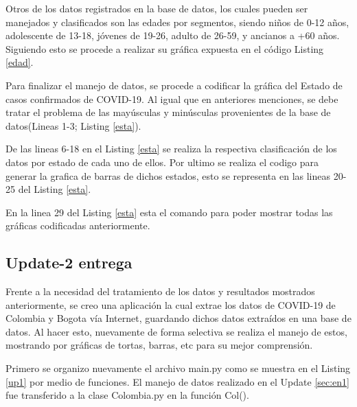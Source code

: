 \documentclass[conference,compsoc,onecolumn]{IEEEtran}
\begin{document}
Otros de los datos registrados en la base de datos, los cuales pueden ser manejados y clasificados son las edades por segmentos, siendo niños de 0-12 años, adolescente de 13-18, jóvenes de 19-26, adulto de 26-59, y ancianos a +60 años. Siguiendo esto se procede a realizar su gráfica expuesta en el código  Listing \ref{edad}.





Para finalizar el manejo de datos, se procede a codificar la gráfica del Estado de casos confirmados de COVID-19. Al igual que en anteriores menciones, se debe tratar el problema de las mayúsculas y minúsculas provenientes de la base de datos(Lineas 1-3; Listing  \ref{esta}). 




De las lineas 6-18 en el Listing \ref{esta} se realiza la respectiva clasificación de los datos por estado de cada uno de ellos. Por ultimo se realiza el codigo para generar la grafica de barras de dichos estados, esto se representa en las lineas 20-25 del Listing \ref{esta}.


En la linea 29 del Listing \ref{esta} esta el comando para poder mostrar todas las gráficas codificadas anteriormente.




\subsection{Update-2 entrega}\label{sec:en2}

Frente a la necesidad del tratamiento de los datos y resultados mostrados anteriormente, se creo una aplicación la cual extrae los datos de COVID-19 de Colombia y Bogota vía Internet, guardando dichos datos extraídos en una base de datos. Al hacer esto, nuevamente de forma selectiva se realiza el manejo de estos, mostrando por gráficas de tortas, barras, etc para su mejor comprensión.

Primero se organizo nuevamente el archivo main.py como se muestra en el Listing \ref{up1} por medio de funciones. El manejo de datos realizado en el Update \ref{sec:en1} fue transferido a la clase Colombia.py en la función Col().
\end{document}
